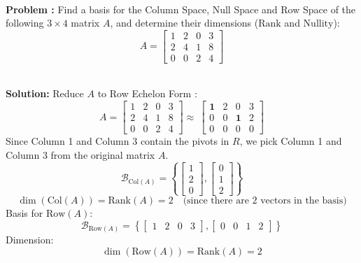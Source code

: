 \documentclass[DIV=20,oneside]{scrartcl}
\newcounter{problem}
\newcommand{\problem}{
	\stepcounter{problem}
	\noindent\textbf{\\Problem \theproblem: }
}
\newcommand{\solution}{
	\noindent\textbf{\\Solution: }
}
\begin{document}
\problem Find a basis for the Column Space, Null Space and Row Space of the following $3 \times 4$ matrix $A$, and determine their dimensions ($\text{Rank}$ and $\text{Nullity}$):$$A = \begin{bmatrix} 1 & 2 & 0 & 3 \\ 2 & 4 & 1 & 8 \\ 0 & 0 & 2 & 4 \end{bmatrix}$$
\solution Reduce $A$ to Row Echelon Form :
$$A = \begin{bmatrix} 1 & 2 & 0 & 3 \\ 2 & 4 & 1 & 8 \\ 0 & 0 & 2 & 4 \end{bmatrix}\approx ~ \begin{bmatrix} \mathbf{1} & 2 & 0 & 3 \\ 0 & 0 & \mathbf{1} & 2 \\ 0 & 0 & 0 & 0 \end{bmatrix}$$
Since Column 1 and Column 3 contain the pivots in $R$, we pick Column 1 and Column 3 from the original matrix $A$.
$$\mathcal{B}_{\text{Col}(A)} = \left\{ \begin{bmatrix} 1 \\ 2 \\ 0 \end{bmatrix}, \begin{bmatrix} 0 \\ 1 \\ 2 \end{bmatrix} \right\}$$
$$\dim(\text{Col}(A)) = \text{Rank}(A) = 2 \quad \text{(since there are 2 vectors in the basis)}$$
Basis for $\text{Row}(A)$:$$\mathcal{B}_{\text{Row}(A)} = \left\{ \begin{bmatrix} 1 & 2 & 0 & 3 \end{bmatrix}, \begin{bmatrix} 0 & 0 & 1 & 2 \end{bmatrix} \right\}$$Dimension:$$\dim(\text{Row}(A)) = \text{Rank}(A) = 2$$
\end{document}
